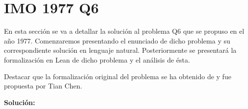 \section{IMO 1977 Q6}

En esta sección se va a detallar la solución al problema Q6
que se propuso en el año 1977. Comenzaremos presentando el
enunciado de dicho problema y su correspondiente solución en
lenguaje natural. Posteriormente se presentará la formalización
en Lean de dicho problema y el análisis de ésta.

Destacar que la formalización original del problema se ha
obtenido de \cite{TC} y fue propuesta por Tian Chen.

\noindent
{}

\textbf{Solución:}



